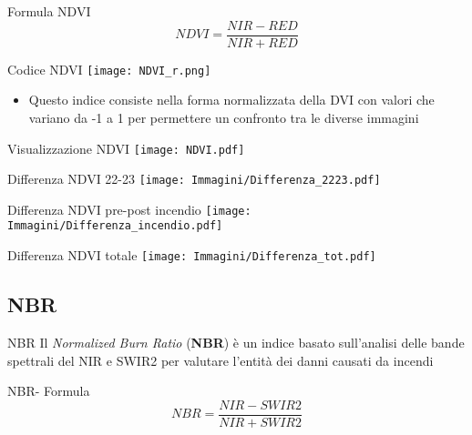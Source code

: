 \documentclass{beamer}
\begin{document}
\begin{frame}{Formula NDVI}
\begin{equation}
    NDVI = \frac{NIR - RED}{NIR + RED} 
\end{equation}
\end{frame}

\begin{frame}{Codice NDVI}
\texttt{[image: NDVI\_r.png]}
\centering
    \begin{itemize}
\item Questo indice consiste nella forma normalizzata della DVI con valori che variano da -1 a 1 per permettere un confronto tra le diverse immagini
\end{itemize}   
    \end{frame}

\begin{frame}{Visualizzazione NDVI}
    \texttt{[image: NDVI.pdf]}
\end{frame}

\begin{frame}{Differenza NDVI 22-23}
\texttt{[image: Immagini/Differenza\_2223.pdf]}
\centering
    \end{frame}

\begin{frame}{Differenza NDVI pre-post incendio}
    \texttt{[image: Immagini/Differenza\_incendio.pdf]}
    \centering
\end{frame}

\begin{frame}{Differenza NDVI totale}
\texttt{[image: Immagini/Differenza\_tot.pdf]}
\centering
    \end{frame}
    
\subsection{NBR}
\begin{frame}{NBR}
Il \textit{Normalized Burn Ratio} (\textbf{NBR}) è un indice basato sull'analisi delle bande spettrali del NIR e SWIR2 per valutare l'entità dei danni causati da incendi    
\end{frame}

\begin{frame}{NBR- Formula}
\begin{equation}
    NBR = \frac{NIR - SWIR2}{NIR + SWIR2} 
\end{equation}
\end{frame}
\end{document}
